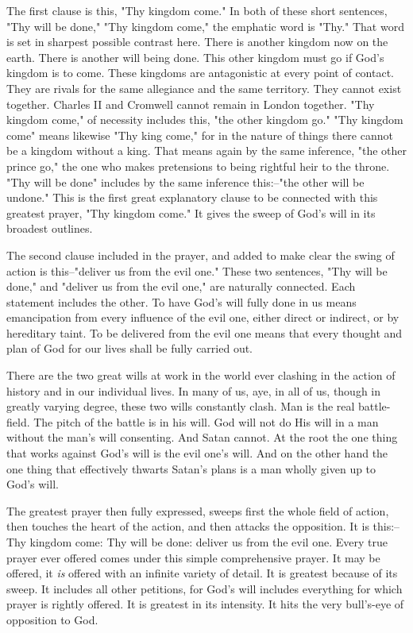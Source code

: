 The first clause is this, "Thy kingdom come." In both of these short
sentences, "Thy will be done," "Thy kingdom come," the emphatic word is
"Thy." That word is set in sharpest possible contrast here. There is
another kingdom now on the earth. There is another will being done. This
other kingdom must go if God's kingdom is to come. These kingdoms are
antagonistic at every point of contact. They are rivals for the same
allegiance and the same territory. They cannot exist together. Charles II
and Cromwell cannot remain in London together. "Thy kingdom come," of
necessity includes this, "the other kingdom go." "Thy kingdom come" means
likewise "Thy king come," for in the nature of things there cannot be a
kingdom without a king. That means again by the same inference, "the other
prince go," the one who makes pretensions to being rightful heir to the
throne. "Thy will be done" includes by the same inference this:--"the
other will be undone." This is the first great explanatory clause to be
connected with this greatest prayer, "Thy kingdom come." It gives the
sweep of God's will in its broadest outlines.

The second clause included in the prayer, and added to make clear the
swing of action is this--"deliver us from the evil one." These two
sentences, "Thy will be done," and "deliver us from the evil one," are
naturally connected. Each statement includes the other. To have God's will
fully done in us means emancipation from every influence of the evil one,
either direct or indirect, or by hereditary taint. To be delivered from
the evil one means that every thought and plan of God for our lives shall
be fully carried out.

There are the two great wills at work in the world ever clashing in the
action of history and in our individual lives. In many of us, aye, in all
of us, though in greatly varying degree, these two wills constantly clash.
Man is the real battle-field. The pitch of the battle is in his will. God
will not do His will in a man without the man's will consenting. And Satan
cannot. At the root the one thing that works against God's will is the
evil one's will. And on the other hand the one thing that effectively
thwarts Satan's plans is a man wholly given up to God's will.

The greatest prayer then fully expressed, sweeps first the whole field of
action, then touches the heart of the action, and then attacks the
opposition. It is this:--Thy kingdom come: Thy will be done: deliver us
from the evil one. Every true prayer ever offered comes under this simple
comprehensive prayer. It may be offered, it \textit{is} offered with an infinite
variety of detail. It is greatest because of its sweep. It includes all
other petitions, for God's will includes everything for which prayer is
rightly offered. It is greatest in its intensity. It hits the very
bull's-eye of opposition to God.




